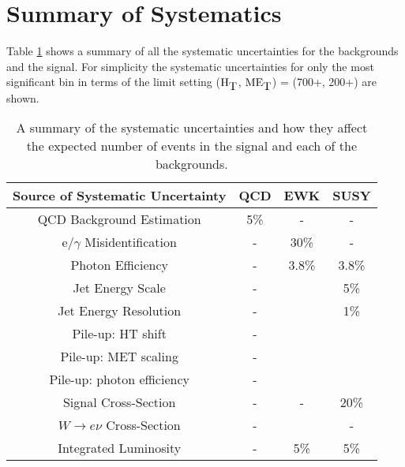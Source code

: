 \section{Summary of Systematics}

Table \ref{tab:Systematics_Summary} shows a summary of all the systematic
uncertainties for the backgrounds and the signal. For simplicity the systematic
uncertainties for only the most significant bin in terms of the limit setting 
($\mbox{H}_{\mbox{T}}$, $\mbox{ME}_{\mbox{T}}$) = (700+, 200+) are shown.

\begin{table}
\begin{center}
\begin{tabular}{|c|c|c|c|}
\hline
{\bf Source of Systematic Uncertainty} & {\bf QCD} & {\bf EWK} & {\bf SUSY} \\
\hline
QCD Background Estimation & 5\% & - & - \\
\hline
e/$\gamma$ Misidentification & - & 30\% & - \\
\hline
Photon Efficiency & - & 3.8\% & 3.8\% \\
\hline
Jet Energy Scale & - & & 5\% \\
\hline
Jet Energy Resolution & - & & 1\% \\
\hline
Pile-up: HT shift & - & & \\
\hline
Pile-up: MET scaling & - & & \\
\hline
Pile-up: photon efficiency & - & & \\
\hline
Signal Cross-Section & - & - & 20\% \\
\hline
$W\rightarrow e\nu$ Cross-Section & - &  & - \\
\hline
Integrated Luminosity & - & 5\% & 5\% \\
\hline
\end{tabular}
\end{center}
\caption{A summary of the systematic uncertainties and how they affect the
expected number of events in the signal and each of the backgrounds.}
\label{tab:Systematics_Summary}
\end{table}
